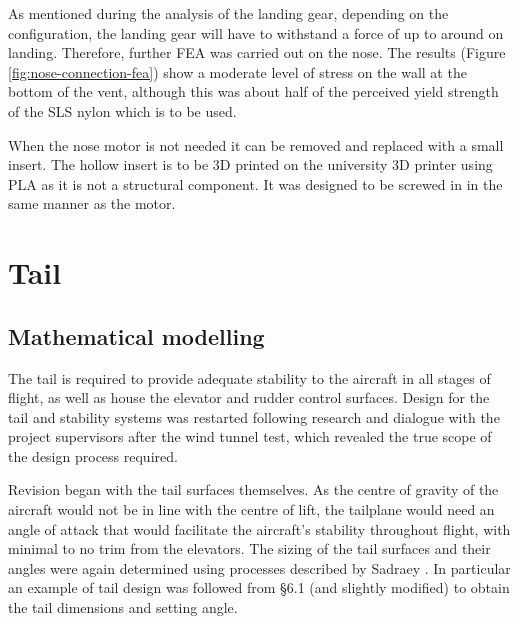 \documentclass[../../main.tex]{subfiles}
\begin{document}
As mentioned during the analysis of the landing gear, depending on the configuration, the landing gear will have to withstand a force of up to around  on landing.
Therefore, further FEA was carried out on the nose.
The results (Figure \ref{fig:nose-connection-fea}) show a moderate level of stress on the wall at the bottom of the vent, although this was about half of the perceived yield strength of the SLS nylon which is to be used. 


When the nose motor is not needed it can be removed and replaced with a small insert.
The hollow insert is to be 3D printed on the university 3D printer using PLA as it is not a structural component.
It was designed to be screwed in in the same manner as the motor. 


\section{Tail} \label{sec:final-design-proposal:tail}

\subsection{Mathematical modelling} \label{sec:final-design-proposal:tail:mathematical-modelling}


The tail is required to provide adequate stability to the aircraft in all stages of flight, as well as house the elevator and rudder control surfaces.
Design for the tail and stability systems was restarted following research and dialogue with the project supervisors after the wind tunnel test, which revealed the true scope of the design process required. 

Revision began with the tail surfaces themselves.
As the centre of gravity of the aircraft would not be in line with the centre of lift, the tailplane would need an angle of attack that would facilitate the aircraft's stability throughout flight, with minimal to no trim from the elevators.
The sizing of the tail surfaces and their angles were again determined using processes described by Sadraey \cite{sadraey-13}.
In particular an example of tail design was followed from \S 6.1 (and slightly modified) to obtain the tail dimensions and setting angle. 
\end{document}
